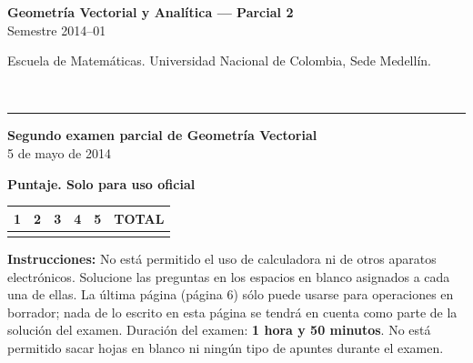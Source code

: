 \documentclass[11pt]{article}
\newcommand{\examheader}{%
  \noindent
  \begin{minipage}[t]{0.6\linewidth}
    {\small\bfseries Geometría Vectorial y Analítica --- Parcial 2}\\
    {\small Semestre 2014--01}
  \end{minipage}%
  \hfill
  \begin{minipage}[t]{0.35\linewidth}
    \raggedleft\small Escuela de Matemáticas. Universidad Nacional de Colombia, Sede Medellín.
  \end{minipage}\\[2pt]
  \rule{\linewidth}{0.6pt}
}
\begin{document}
\examheader

\begin{center}
{\bfseries Segundo examen parcial de Geometría Vectorial}\\
5 de mayo de 2014

\vspace{4pt}
\textbf{Puntaje. Solo para uso oficial}

\vspace{2pt}
\begin{tabular}{|c|c|c|c|c|c|}
\hline
1 & 2 & 3 & 4 & 5 & TOTAL\\
\hline
 & & & & & \\
\hline
\end{tabular}
\end{center}

\textbf{Instrucciones:} No está permitido el uso de calculadora ni de otros aparatos electrónicos. Solucione las preguntas en los espacios en blanco asignados a cada una de ellas. La última página (página 6) sólo puede usarse para operaciones en borrador; nada de lo escrito en esta página se tendrá en cuenta como parte de la solución del examen. Duración del examen: \textbf{1 hora y 50 minutos}. No está permitido sacar hojas en blanco ni ningún tipo de apuntes durante el examen.

\vspace{10pt}
\end{document}
